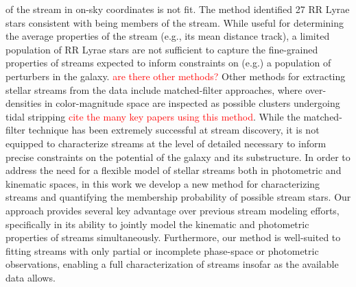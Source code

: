 \documentclass[twocolumn]{aastex631}
\newcommand{\TODO}[1]{{\textcolor{red}{#1}}}
\newcommand{\JN}[1]{\TODO{#1}}
\begin{document}
    of the stream in on-sky coordinates is not fit. The method identified 27 RR
    Lyrae stars consistent with being members of the stream. While useful for
    determining the average properties of the stream (e.g., its mean distance
    track), a limited population of RR Lyrae stars are not sufficient to capture
    the fine-grained properties of streams expected to inform constraints on
    (e.g.) a population of perturbers in the galaxy. \JN{are there other
    methods?}
    Other methods for extracting stellar streams from the data include
    matched-filter approaches, where over-densities in color-magnitude space are
    inspected as possible clusters undergoing tidal stripping \JN{cite the many
    key papers using this method}. While the matched-filter technique has been
    extremely successful at stream discovery, it is not equipped to characterize
    streams at the level of detailed necessary to inform precise constraints on
    the potential of the galaxy and its substructure.
    In order to address the need for a flexible model of stellar streams both in
    photometric and kinematic spaces, in this work we develop a new method for
    characterizing streams and quantifying the membership probability of
    possible stream stars. Our approach provides several key advantage over
    previous stream modeling efforts, specifically in its ability to jointly
    model the kinematic and photometric properties of streams simultaneously.
    Furthermore, our method is well-suited to fitting streams with only partial
    or incomplete phase-space or photometric observations, enabling a full
    characterization of streams insofar as the available data allows. 
\end{document}
